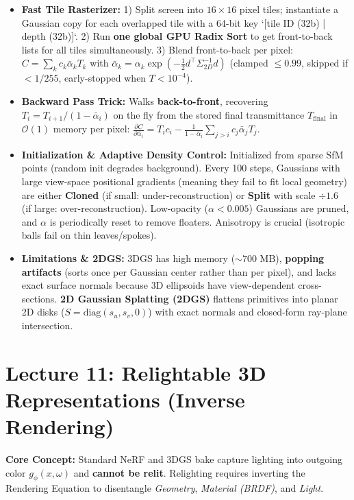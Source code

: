 \documentclass[11pt,a4paper]{article}
\theoremstyle{definition}
\theoremstyle{plain}
\theoremstyle{remark}
\begin{document}
\begin{itemize}
\begin{itemize}
        $$\mu_{2D} = \pi(W\mu + t), \qquad \Sigma_{2D} = J W \Sigma W^\top J^\top \in \mathbb{R}^{2\times 2}$$
        \item \textbf{Fast Tile Rasterizer:}
        1) Split screen into $16\times 16$ pixel tiles; instantiate a Gaussian copy for each overlapped tile with a 64-bit key `[tile ID (32b) | depth (32b)]`.
        2) Run \textbf{one global GPU Radix Sort} to get front-to-back lists for all tiles simultaneously.
        3) Blend front-to-back per pixel: $C = \sum_k c_k \bar{\alpha}_k T_k$ with $\bar{\alpha}_k = \alpha_k \exp(-\frac{1}{2} d^\top \Sigma_{2D}^{-1} d)$ (clamped $\le 0.99$, skipped if $<1/255$, early-stopped when $T < 10^{-4}$).
        \item \textbf{Backward Pass Trick:} Walks \textbf{back-to-front}, recovering $T_i = T_{i+1} / (1 - \bar{\alpha}_i)$ on the fly from the stored final transmittance $T_{\text{final}}$ in $\mathcal{O}(1)$ memory per pixel: $\frac{\partial C}{\partial \bar{\alpha}_i} = T_i c_i - \frac{1}{1-\bar{\alpha}_i}\sum_{j>i} c_j \bar{\alpha}_j T_j$.
        \item \textbf{Initialization \& Adaptive Density Control:} Initialized from sparse SfM points (random init degrades background). Every 100 steps, Gaussians with large view-space positional gradients (meaning they fail to fit local geometry) are either \textbf{Cloned} (if small: under-reconstruction) or \textbf{Split} with scale $\div 1.6$ (if large: over-reconstruction). Low-opacity ($\alpha < 0.005$) Gaussians are pruned, and $\alpha$ is periodically reset to remove floaters. Anisotropy is crucial (isotropic balls fail on thin leaves/spokes).
        \item \textbf{Limitations \& 2DGS:} 3DGS has high memory ($\sim 700\text{ MB}$), \textbf{popping artifacts} (sorts once per Gaussian center rather than per pixel), and lacks exact surface normals because 3D ellipsoids have view-dependent cross-sections. \textbf{2D Gaussian Splatting (2DGS)} flattens primitives into planar 2D disks ($S = \text{diag}(s_u, s_v, 0)$) with exact normals and closed-form ray-plane intersection.
    \end{itemize}
\end{itemize}

\hr
\section*{\textcolor{primary}{Lecture 11: Relightable 3D Representations (Inverse Rendering)}}
\textbf{Core Concept:} Standard NeRF and 3DGS bake capture lighting into outgoing color $g_\phi(x,\omega)$ and \textbf{cannot be relit}. Relighting requires inverting the Rendering Equation to disentangle \emph{Geometry}, \emph{Material (BRDF)}, and \emph{Light}.
\end{document}
